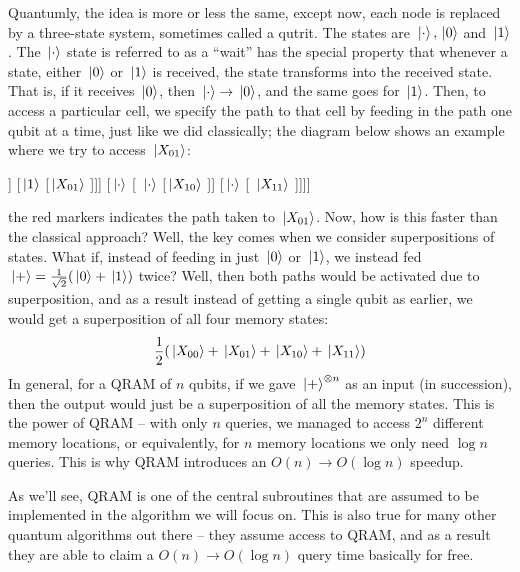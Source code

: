 \documentclass[11pt]{article}
\begin{document}
	Quantumly, the idea is more or less the same, except now, each node is replaced by a three-state system, 
	sometimes called a qutrit. The states are \( \ket*{\cdot}, \ket*{0} \) and \( \ket*{1} \). The \( \ket*{\cdot} \) 
	state is referred to as a ``wait'' has the special property that whenever a state, either \( \ket*{0} \) 
	or \( \ket*{1} \) is received, the state transforms into the received state. That is, if it receives \( \ket*{0} \),
	then \( \ket*{\cdot} \to \ket*{0} \), and the same goes for \( \ket*{1} \). Then, to access a particular 
	cell, we specify the path to that cell by feeding in the path one qubit at a time, 
	just like we did classically; the diagram below shows an example 
	where we try to access \( \ket*{X_{01}} \):

	\begin{center}
		\begin{forest}
			[\( \cdot \) [\textcolor{red}{\( \ket*{0} \)} [\( \ket*{\cdot} \) [ \( \ket*{X_{00}} \)]] 
			[\textcolor{red}{\( \ket*{1} \)} 
			[\textcolor{red}{\( \ket*{X_{01}} \) }]]] [\( \ket*{\cdot} \) 
			[ \( \ket*{\cdot} \) [\( \ket*{X_{10}} \) ]] [\( \ket*{\cdot} \) [ \( \ket*{X_{11}} \) ]]]]
		\end{forest}
	\end{center}
	the red markers indicates the path taken to \( \ket*{X_{01}} \). Now, how is this faster than the classical 
	approach? Well, the key comes when we consider superpositions of states. What if, instead of feeding in  
	just \( \ket*{0} \) or \( \ket*{1} \), we instead fed \( \ket*{+} = \frac{1}{\sqrt{2} }(\ket*{0} + \ket*{1}) \) 
	twice? Well, then both paths would be activated due to superposition, and as a result instead of getting a single 
	qubit as earlier, we would get a superposition of all four memory states: 
	\[
	\frac{1}{2}(\ket*{X_{00}} + \ket*{X_{01}} + \ket*{X_{10}} + \ket*{X_{11}})
	\] 
	In general, for a QRAM of \( n \) qubits, if we gave \( \ket*{+}^{\otimes n} \) as an input (in succession), 
	then the output 
	would just be a superposition of all the memory states. This is the power of QRAM -- with  
	only \( n \) queries, we managed to access \( 2^{n} \) different memory locations, or equivalently, for \( n \) 
	memory locations we only need \( \log n \) queries. This is why QRAM introduces an \( O(n) \to 
	O(\log n)\) speedup.   

	As we'll see, QRAM is one of the central subroutines that are assumed to be implemented in the algorithm we 
	will focus on. This is also true for many other quantum algorithms out there -- they assume access to 
	QRAM, and as a result they are able to claim a \( O(n) \to O(\log n) \) query time basically for free.  
\end{document}
